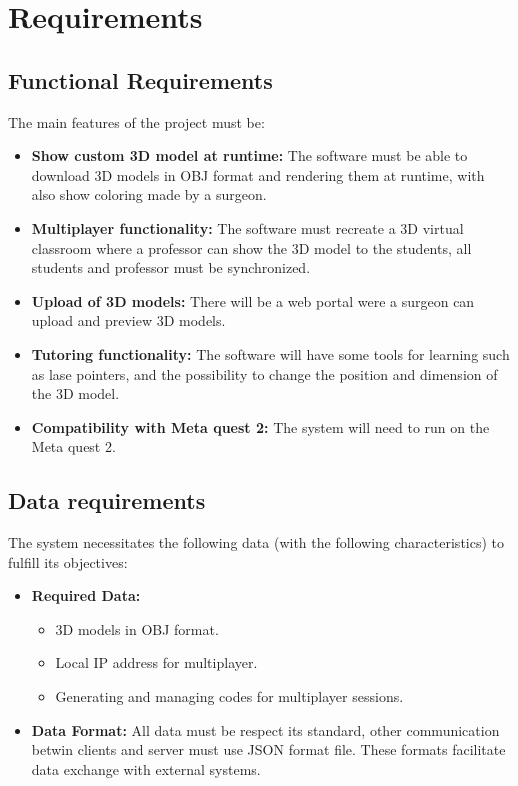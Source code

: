 
\chapter{Requirements}
\label{chp:Requirements}

\section{Functional Requirements}
\noindent
The main features of the project must be:

\begin{itemize}
  \item \textbf{Show custom 3D model at runtime:} The software must be able to download 3D models in OBJ format and rendering them at runtime, with also show coloring made by a surgeon.
  \item \textbf{Multiplayer functionality:} The software must recreate a 3D virtual classroom where a professor can show the 3D model to the students, all students and professor must be synchronized.
  \item \textbf{Upload of 3D models:} There will be a web portal were a surgeon can upload and preview 3D models.
  \item \textbf{Tutoring functionality:} The software will have some tools for learning such as lase pointers, and the possibility to change the position and dimension of the 3D model.
  \item \textbf{Compatibility with Meta quest 2:} The system will need to run on the Meta quest 2.
\end{itemize}

\section{Data requirements}
\noindent
The system necessitates the following data (with the following characteristics) to fulfill its objectives:

\begin{itemize}
  \item \textbf{Required Data:} 
  \begin{itemize}
    \item 3D models in OBJ format.
    \item Local \ac{IP} address for multiplayer.
    \item Generating and managing codes for multiplayer sessions.
  \end{itemize}
  \item \textbf{Data Format:} All data must be respect its standard, other communication betwin clients and server must use \ac{JSON} format file.
  These formats facilitate data exchange with external systems.
\end{itemize}

